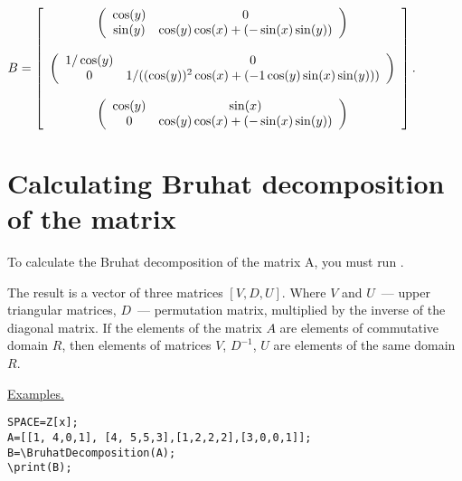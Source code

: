 {$B = \left[\begin{array}{c}
\mtr{\cos(y)}{0}{\sin(y)}{\cos(y)\cos(x)+(-\sin(x)\sin(y))}\\
\null \\
\mtr{1/\cos(y)}{0}{0}{1/((\cos(y))^2\cos(x)+(-1\cos(y)\sin(x)\sin(y)))}\\
\null \\
\mtr{\cos(y)}{\sin(x)}{0}{\cos(y)\cos(x)+(-\sin(x)\sin(y))}\\
 \end{array}\right].$}

\section{Calculating Bruhat decomposition of the matrix} 
To calculate the Bruhat decomposition of the matrix A, you must run 
 . 

 The result is a vector of three matrices $[V,D,U]$. Where $V$ and $U$~--- upper triangular matrices, 
$D$~--- permutation matrix, multiplied by the inverse of the diagonal matrix. If the elements of the matrix $A$ are elements of commutative domain $R$, then 
elements of  matrices $V$, $D^{-1}$, $U$ are elements of the same domain $R$.

\underline{Examples. }

\begin{verbatim}
SPACE=Z[x]; 
A=[[1, 4,0,1], [4, 5,5,3],[1,2,2,2],[3,0,0,1]];
B=\BruhatDecomposition(A);
\print(B);
\end{verbatim}

